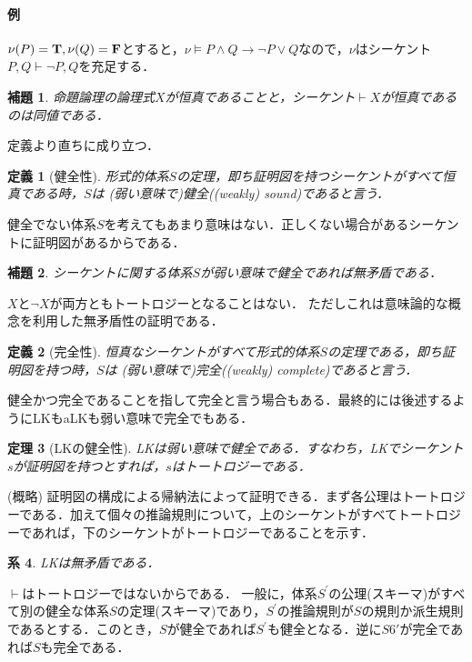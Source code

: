 \documentclass{ltjsarticle}
\makeatletter
\theoremstyle{mystyle1}
\theoremstyle{mystyle3}
\newtheorem{cor}{系}
\newtheorem{lem}[cor]{補題}
\newtheorem{thm}[cor]{定理}
\theoremstyle{mystyle2}
\newtheorem{dfn*}{定義}
\renewenvironment{proof}[1][\proofname]{\par
  \pushQED{\qed}%
  \normalfont
  \topsep6\p@\@plus6\p@ \trivlist
  \item[\hskip\labelsep{\bfseries\sffamily #1}]\ignorespaces
}{%
  \popQED\endtrivlist\@endpefalse
}
\renewcommand\proofname{\ensuremath{\because}}
\newcommand{\bT}{\ensuremath{\mathbf{T}}}
\newcommand{\bF}{\ensuremath{\mathbf{F}}}
\newcommand{\red}[1]{{\color{red} #1}}
\makeatother
\begin{document}
\paragraph{例}
$\nu\qty(P)=\bT, \nu\qty(Q)=\bF$とすると，$\nu\models P\wedge Q\to \neg P\vee Q$なので，$\nu$はシーケント$P,Q\vdash\neg P,Q$を充足する．
\begin{lem}
  命題論理の論理式$X$が恒真であることと，シーケント$\vdash X$が恒真であるのは同値である．
\end{lem}
\begin{proof}
  定義より直ちに成り立つ．
\end{proof}
\begin{dfn*}[健全性]
  形式的体系$S$の定理，即ち証明図を持つシーケントがすべて恒真である時，$S$は\red{(弱い意味で)健全}((weakly) sound)であると言う．
\end{dfn*}
健全でない体系$S$を考えてもあまり意味はない．正しくない場合があるシーケントに証明図があるからである．
\begin{lem}
  シーケントに関する体系$S$が弱い意味で健全であれば無矛盾である．
\end{lem}
\begin{proof}
  $X$と$\neg X$が両方ともトートロジーとなることはない．
\end{proof}
ただしこれは意味論的な概念を利用した無矛盾性の証明である．
\begin{dfn*}[完全性]
  恒真なシーケントがすべて形式的体系$S$の定理である，即ち証明図を持つ時，$S$は\red{(弱い意味で)完全}((weakly) complete)であると言う．
\end{dfn*}
健全かつ完全であることを指して完全と言う場合もある．最終的には後述するようにLKもaLKも弱い意味で完全でもある．
\begin{thm}[LKの健全性]\label{thm:LK-sound}
  LKは弱い意味で健全である．すなわち，LKでシーケント$s$が証明図を持つとすれば，$s$はトートロジーである．
\end{thm}
\begin{proof}
  (概略) 証明図の構成による帰納法によって証明できる．まず各公理はトートロジーである．加えて個々の推論規則について，上のシーケントがすべてトートロジーであれば，下のシーケントがトートロジーであることを示す．
\end{proof}
\begin{cor}
  LKは無矛盾である．
\end{cor}
\begin{proof}
  $\vdash$はトートロジーではないからである．
\end{proof}
一般に，体系$S^\prime$の公理(スキーマ)がすべて別の健全な体系$S$の定理(スキーマ)であり，$S^\prime$の推論規則が$S$の規則か派生規則であるとする．このとき，$S$が健全であれば$S^\prime$も健全となる．逆に$S6\prime$が完全であれば$S$も完全である．
\end{document}
